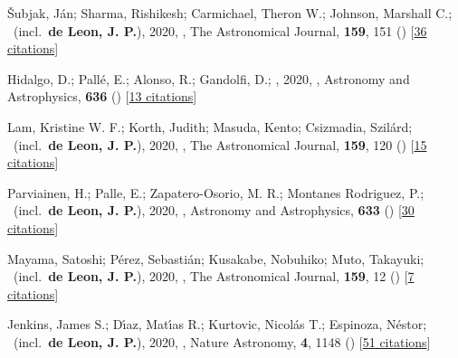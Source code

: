 \item[{\color{numcolor}\scriptsize24}] {\v{S}}ubjak, J{\'a}n; Sharma, Rishikesh; Carmichael, Theron W.; Johnson, Marshall C.; \etal\ (incl.\ \textbf{de Leon, J. P.}), 2020, , The Astronomical Journal, \textbf{159}, 151 () [\href{https://ui.adsabs.harvard.edu/abs/2020AJ....159..151S}{36 citations}]

\item[{\color{numcolor}\scriptsize23}] Hidalgo, D.; Pall{\'e}, E.; Alonso, R.; Gandolfi, D.; \etal, 2020, , Astronomy and Astrophysics, \textbf{636} () [\href{https://ui.adsabs.harvard.edu/abs/2020A&A...636A..89H}{13 citations}]

\item[{\color{numcolor}\scriptsize22}] Lam, Kristine W. F.; Korth, Judith; Masuda, Kento; Csizmadia, Szil{\'a}rd; \etal\ (incl.\ \textbf{de Leon, J. P.}), 2020, , The Astronomical Journal, \textbf{159}, 120 () [\href{https://ui.adsabs.harvard.edu/abs/2020AJ....159..120L}{15 citations}]

\item[{\color{numcolor}\scriptsize21}] Parviainen, H.; Palle, E.; Zapatero-Osorio, M. R.; Montanes Rodriguez, P.; \etal\ (incl.\ \textbf{de Leon, J. P.}), 2020, , Astronomy and Astrophysics, \textbf{633} () [\href{https://ui.adsabs.harvard.edu/abs/2020A&A...633A..28P}{30 citations}]

\item[{\color{numcolor}\scriptsize20}] Mayama, Satoshi; P{\'e}rez, Sebasti{\'a}n; Kusakabe, Nobuhiko; Muto, Takayuki; \etal\ (incl.\ \textbf{de Leon, J. P.}), 2020, , The Astronomical Journal, \textbf{159}, 12 () [\href{https://ui.adsabs.harvard.edu/abs/2020AJ....159...12M}{7 citations}]

\item[{\color{numcolor}\scriptsize19}] Jenkins, James S.; D{\'\i}az, Mat{\'\i}as R.; Kurtovic, Nicol{\'a}s T.; Espinoza, N{\'e}stor; \etal\ (incl.\ \textbf{de Leon, J. P.}), 2020, , Nature Astronomy, \textbf{4}, 1148 () [\href{https://ui.adsabs.harvard.edu/abs/2020NatAs...4.1148J}{51 citations}]

